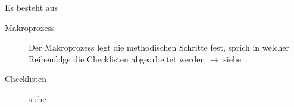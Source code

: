   Es besteht aus
  \begin{description}
    \item[Makroprozess]
      Der Makroprozess legt die methodischen Schritte fest, sprich in welcher
      Reihenfolge die Checklisten abgearbeitet werden $\rightarrow$ siehe 
    \item[Checklisten]
      siehe 
  \end{description}
  
  